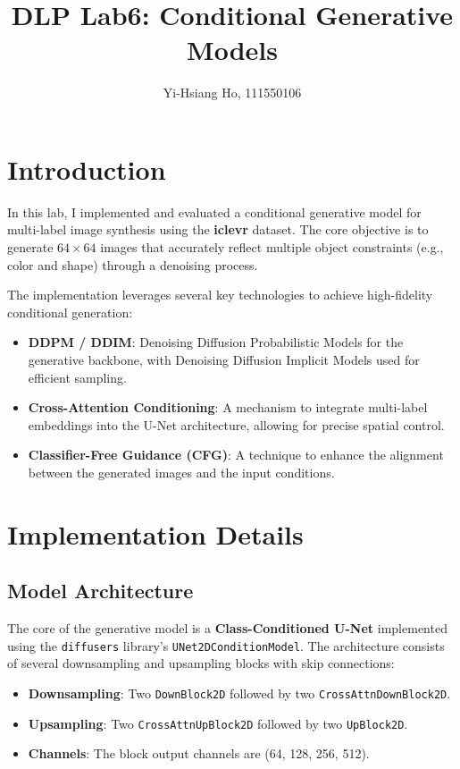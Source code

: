 \documentclass[10pt,twocolumn,letterpaper]{article}
\begin{document}
\title{DLP Lab6: Conditional Generative Models}

\author{Yi-Hsiang Ho, 111550106
}
\maketitle


\section{Introduction}
\label{sec:intro}

In this lab, I implemented and evaluated a conditional generative model for
multi-label image synthesis using the \textbf{iclevr} dataset. The core
objective is to generate $64 \times 64$ images that accurately reflect
multiple object constraints (e.g., color and shape) through a denoising
process.

The implementation leverages several key technologies to achieve high-fidelity
conditional generation:
\begin{itemize}[itemsep=-3pt]
  \item \textbf{DDPM / DDIM}: Denoising Diffusion Probabilistic Models
    for the generative backbone, with Denoising Diffusion Implicit Models
    used for efficient sampling.
  \item \textbf{Cross-Attention Conditioning}: A mechanism to integrate
    multi-label embeddings into the U-Net architecture, allowing for precise
    spatial control.
  \item \textbf{Classifier-Free Guidance (CFG)}: A technique to enhance the
    alignment between the generated images and the input conditions.
\end{itemize}


\section{Implementation Details}
\label{sec:impl}

\subsection{Model Architecture}

The core of the generative model is a \textbf{Class-Conditioned U-Net}
implemented using the \verb|diffusers| library's
\verb|UNet2DConditionModel|. The architecture consists of several
downsampling and upsampling blocks with skip connections:
\begin{itemize}[itemsep=-3pt]
  \item \textbf{Downsampling}: Two \verb|DownBlock2D| followed by
  two \verb|CrossAttnDownBlock2D|.
  \item \textbf{Upsampling}: Two \verb|CrossAttnUpBlock2D| followed by
  two \verb|UpBlock2D|.
  \item \textbf{Channels}: The block output channels are (64, 128, 256, 512).
\end{itemize}
\end{document}
